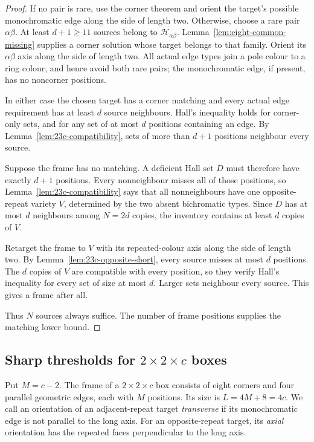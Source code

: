 \begin{proof}
If no pair is rare, use the corner theorem and orient the target's
possible monochromatic edge along the side of length two. Otherwise,
choose a rare pair $\alpha\beta$. At least $d+1\ge11$ sources belong to
$\mathcal H_{\alpha\beta}$. Lemma~\ref{lem:eight-common-missing} supplies a corner solution
whose target belongs to that family. Orient its $\alpha\beta$ axis along the side
of length two. All actual edge types join a pole colour to a ring colour,
and hence avoid both rare pairs; the monochromatic edge, if present,
has no noncorner positions.

In either case the chosen target has a corner matching and every actual
edge requirement has at least $d$ source neighbours. Hall's inequality
holds for corner-only sets, and for any set of at most $d$ positions
containing an edge. By Lemma~\ref{lem:23c-compatibility}, sets of more
than $d+1$ positions neighbour every source.

Suppose the frame has no matching. A deficient Hall set $D$ must therefore
have exactly $d+1$ positions. Every nonneighbour misses all of those
positions, so Lemma~\ref{lem:23c-compatibility} says that all nonneighbours
have one opposite-repeat variety $V$, determined by the two absent
bichromatic types. Since $D$ has at most $d$ neighbours among $N=2d$
copies, the inventory contains at least $d$ copies of $V$.

Retarget the frame to $V$ with its repeated-colour axis along the side
of length two. By Lemma~\ref{lem:23c-opposite-short}, every source misses
at most $d$ positions. The $d$ copies of $V$ are compatible with every
position, so they verify Hall's inequality for every set of size at most
$d$. Larger sets neighbour every source. This gives a frame after all.

Thus $N$ sources always suffice. The number of frame positions supplies
the matching lower bound.
\end{proof}

\subsection[Sharp thresholds for 2 by 2 by c boxes]{Sharp thresholds for $2\times2\times c$ boxes}

Put $M=c-2$. The frame of a $2\times2\times c$ box consists of eight
corners and four parallel geometric edges, each with $M$ positions. Its
size is $L=4M+8=4c$. We call an orientation of an adjacent-repeat target
\emph{transverse} if its monochromatic edge is not parallel to the long
axis. For an opposite-repeat target, its \emph{axial} orientation has
the repeated faces perpendicular to the long axis.

